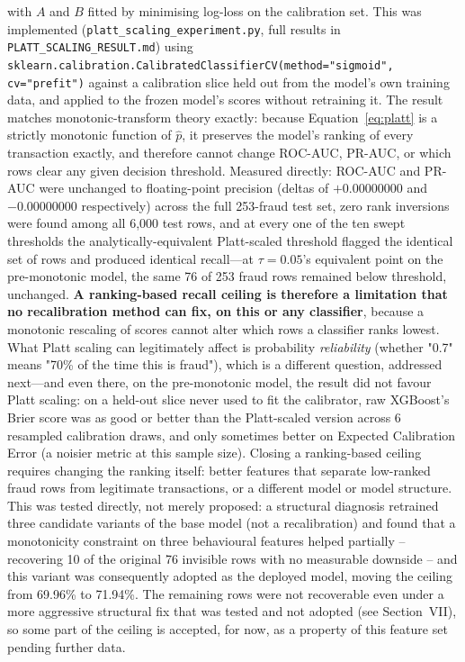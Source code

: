 \documentclass[conference]{IEEEtran}
\begin{document}
with $A$ and $B$ fitted by minimising log-loss on the calibration set. This
was implemented (\texttt{platt\_scaling\_experiment.py}, full results in
\texttt{PLATT\_SCALING\_RESULT.md}) using
\texttt{sklearn.calibration.CalibratedClassifierCV(method{=}"sigmoid",
cv{=}"prefit")} against a calibration slice held out from the model's own
training data, and applied to the frozen model's scores without retraining
it. The result matches monotonic-transform theory exactly: because
Equation~\ref{eq:platt} is a strictly monotonic function of $\hat{p}$, it
preserves the model's ranking of every transaction exactly, and therefore
cannot change ROC-AUC, PR-AUC, or which rows clear any given decision
threshold. Measured directly: ROC-AUC and PR-AUC were unchanged to
floating-point precision (deltas of $+0.00000000$ and $-0.00000000$
respectively) across the full 253-fraud test set, zero rank inversions were
found among all 6,000 test rows, and at every one of the ten swept
thresholds the analytically-equivalent Platt-scaled threshold flagged the
identical set of rows and produced identical recall---at $\tau=0.05$'s
equivalent point on the pre-monotonic model, the same 76 of 253 fraud rows
remained below threshold, unchanged. \textbf{A ranking-based recall ceiling
is therefore a limitation that no recalibration method can fix, on this or
any classifier}, because a monotonic rescaling of scores cannot alter which
rows a classifier ranks lowest. What Platt scaling can legitimately affect
is probability \textit{reliability} (whether "0.7" means "70\% of the time
this is fraud"), which is a different question, addressed next---and even
there, on the pre-monotonic model, the result did not favour Platt scaling:
on a held-out slice never used to fit the calibrator, raw XGBoost's Brier
score was as good or better than the Platt-scaled version across 6
resampled calibration draws, and only sometimes better on Expected
Calibration Error (a noisier metric at this sample size). Closing a
ranking-based ceiling requires changing the ranking itself: better features
that separate low-ranked fraud rows from legitimate transactions, or a
different model or model structure. This was tested directly, not merely
proposed: a structural diagnosis retrained three candidate variants of the
base model (not a recalibration) and found that a monotonicity constraint
on three behavioural features helped partially -- recovering 10 of the
original 76 invisible rows with no measurable downside -- and this variant
was consequently adopted as the deployed model, moving the ceiling from
69.96\% to 71.94\%. The remaining rows were not recoverable even under a
more aggressive structural fix that was tested and not adopted (see
Section~VII), so some part of the ceiling is accepted, for now, as a
property of this feature set pending further data.
\end{document}
